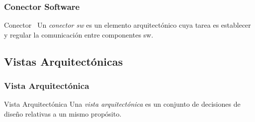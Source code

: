 ﻿\documentclass[handout,a4paper,slidestop,xcolor=pst,blue]{beamer}
\begin{document}
\begin{frame}
   \frametitle{Conector Software}
   \begin{block}{Conector~\cite{taylor:2009}}
		Un \emph{conector sw} es un elemento arquitectónico cuya tarea es establecer y regular la comunicación entre componentes sw.
	\end{block}
\end{frame}

\subsection{Vistas Arquitectónicas}


\begin{frame}[c]
	\frametitle{Vista Arquitectónica}
	\begin{block}{Vista Arquitectónica}
		Una \emph{vista arquitectónica} es un conjunto de decisiones de diseño relativas a un mismo propósito.
	\end{block}
\end{frame}
\end{document}
